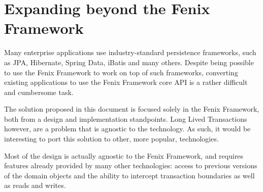 \section{Expanding beyond the Fenix Framework}

Many enterprise applications use industry-standard persistence
frameworks, such as JPA, Hibernate, Spring Data, iBatis and many
others. Despite being possible to use the Fenix Framework to work on
top of such frameworks, converting existing applications to use the
Fenix Framework core API is a rather difficult and cumbersome task.

The solution proposed in this document is focused solely in the Fenix
Framework, both from a design and implementation standpoints. Long
Lived Transactions however, are a problem that is agnostic to the
technology. As such, it would be interesting to port this solution to
other, more popular, technologies.

Most of the design is actually agnostic to the Fenix Framework, and
requires features already provided by many other technologies: access
to previous versions of the domain objects and the ability to
intercept transaction boundaries as well as reads and writes.



